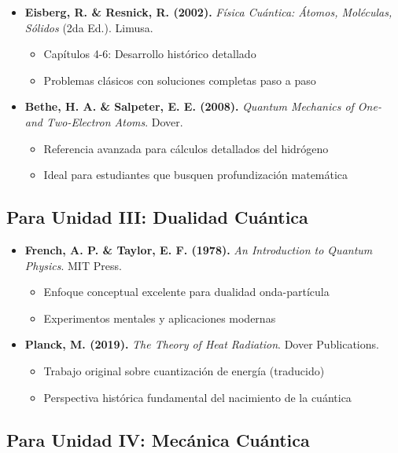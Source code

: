 \begin{tecnologiabox}
\begin{tecnologiabox}
\begin{tecnologiabox}
\begin{itemize}
	\item \textbf{Eisberg, R. \& Resnick, R. (2002).} \textit{Física Cuántica: Átomos, Moléculas, Sólidos} (2da Ed.). Limusa.
	\begin{itemize}
		\item Capítulos 4-6: Desarrollo histórico detallado
		\item Problemas clásicos con soluciones completas paso a paso
	\end{itemize}
	
	\item \textbf{Bethe, H. A. \& Salpeter, E. E. (2008).} \textit{Quantum Mechanics of One- and Two-Electron Atoms}. Dover.
	\begin{itemize}
		\item Referencia avanzada para cálculos detallados del hidrógeno
		\item Ideal para estudiantes que busquen profundización matemática
	\end{itemize}
\end{itemize}

\subsection{Para Unidad III: Dualidad Cuántica}

\begin{itemize}
	\item \textbf{French, A. P. \& Taylor, E. F. (1978).} \textit{An Introduction to Quantum Physics}. MIT Press.
	\begin{itemize}
		\item Enfoque conceptual excelente para dualidad onda-partícula
		\item Experimentos mentales y aplicaciones modernas
	\end{itemize}
	
	\item \textbf{Planck, M. (2019).} \textit{The Theory of Heat Radiation}. Dover Publications.
	\begin{itemize}
		\item Trabajo original sobre cuantización de energía (traducido)
		\item Perspectiva histórica fundamental del nacimiento de la cuántica
	\end{itemize}
\end{itemize}

\subsection{Para Unidad IV: Mecánica Cuántica}


\end{tecnologiabox}
\end{tecnologiabox}
\end{tecnologiabox}
